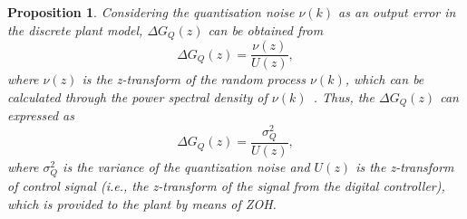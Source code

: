 \documentclass{sig-alternate-05-2015}
\newtheorem{myprop}{Proposition}
\begin{document}
\begin{myprop}
Considering the quantisation noise $\nu(k)$ as an output error in the
discrete plant model, 
$\Delta{G_{Q}(z)}$ can be obtained from
%
\begin{equation}
\label{eq:quantization_tf}
\Delta{G_{Q}(z)}=\frac{\nu(z)}{U(z)},
\end{equation}
where $\nu(z)$ is the z-transform of the random process $\nu(k)$,
which can be calculated through the power spectral density of
$\nu(k)$~\cite{poularikas2000transforms}.  
Thus, the $\Delta{G_{Q}(z)}$ can expressed as
%
\begin{equation}
\label{eq:deltag_var}
\Delta{G_{Q}(z)}=\frac{\sigma_{Q}^{2}}{U(z)},
\end{equation}
where $\sigma_{Q}^{2}$ is the variance of the quantization noise and
$U(z)$ is the z-transform of control signal ({\it i.e.}, the z-transform of
the signal from the digital controller), which is provided to the plant by
means of ZOH.
\end{myprop}
\end{document}
